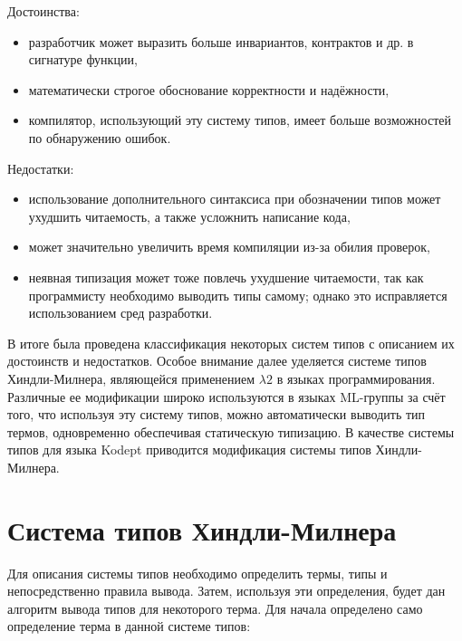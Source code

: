 Достоинства:
\begin{itemize}
    \item разработчик может выразить больше инвариантов, контрактов и др. в сигнатуре функции,
    \item математически строгое обоснование корректности и надёжности,
    \item компилятор, использующий эту систему типов, имеет больше возможностей по обнаружению ошибок.
\end{itemize}

Недостатки:
\begin{itemize}
    \item использование дополнительного синтаксиса при обозначении типов может ухудшить читаемость, а также усложнить написание кода,
    \item может значительно увеличить время компиляции из-за обилия проверок,
    \item неявная типизация может тоже повлечь ухудшение читаемости, так как программисту необходимо выводить типы самому; однако это исправляется использованием сред разработки.
\end{itemize}

В итоге была проведена классификация некоторых систем типов с описанием их достоинств и недостатков.
Особое внимание далее уделяется системе типов Хиндли-Милнера, являющейся применением $\lambda 2$ в языках программирования.
Различные ее модификации широко используются в языках ML-группы за счёт того, что используя эту систему типов, можно автоматически выводить тип термов, одновременно обеспечивая статическую типизацию.
В качестве системы типов для языка Kodept приводится модификация системы типов Хиндли-Милнера.



\section{Система типов Хиндли-Милнера}
\label{sec:hindley-milner}


Для описания системы типов необходимо определить термы, типы и непосредственно правила вывода.
Затем, используя эти определения, будет дан алгоритм вывода типов для некоторого терма.
Для начала определено само определение терма в данной системе типов:

